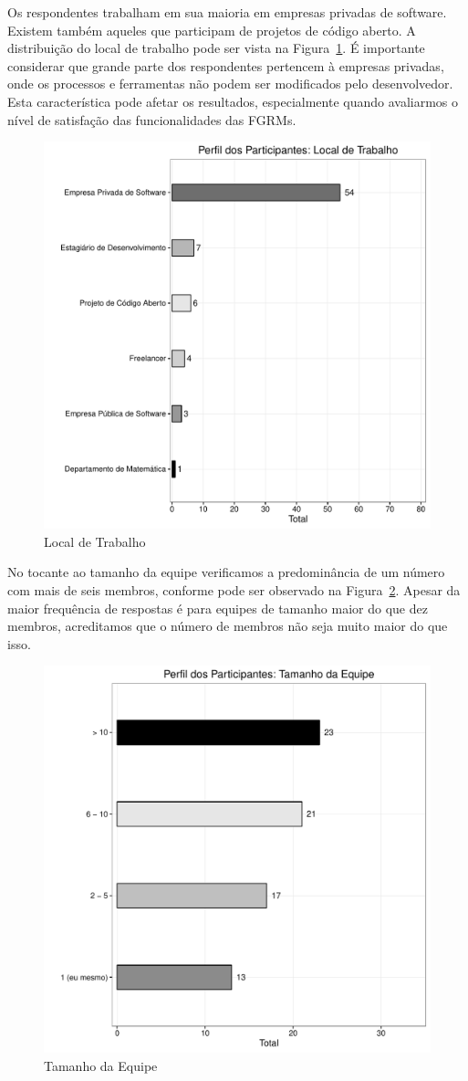 Os respondentes trabalham em sua maioria em empresas privadas de software.
Existem também aqueles que participam de projetos de código aberto. A
distribuição do local de trabalho pode ser vista na
Figura~\ref{fig:grafico_melhorias_fgrm_local_trabalho}. É importante considerar
que grande parte dos respondentes pertencem à empresas privadas, onde os
processos e ferramentas não podem ser modificados pelo desenvolvedor. Esta
característica pode afetar os resultados, especialmente quando avaliarmos o
nível de satisfação das funcionalidades das FGRMs.

\begin{figure}[htpb]
	\centering
	\includegraphics[width=0.6\linewidth]{./chapter-pesquisa-com-profissionais/img/grafico_melhorias_fgrm_local_trabalho.pdf}
	\caption{Local de Trabalho}
\label{fig:grafico_melhorias_fgrm_local_trabalho}
\end{figure}

No tocante ao tamanho da equipe verificamos a predominância de um número com
mais de seis membros, conforme pode ser observado na
Figura~\ref{fig:grafico_melhorias_fgrm_tamanho_equipe}. Apesar da maior
frequência de respostas é para equipes de tamanho maior do que dez membros,
acreditamos que o número de membros não seja muito maior do que isso.

\begin{figure}[htpb]
	\centering
	\includegraphics[width=0.6\linewidth]{./chapter-pesquisa-com-profissionais/img/grafico_melhorias_fgrm_tamanho_equipe.pdf}
	\caption{Tamanho da Equipe}
\label{fig:grafico_melhorias_fgrm_tamanho_equipe}
\end{figure}

